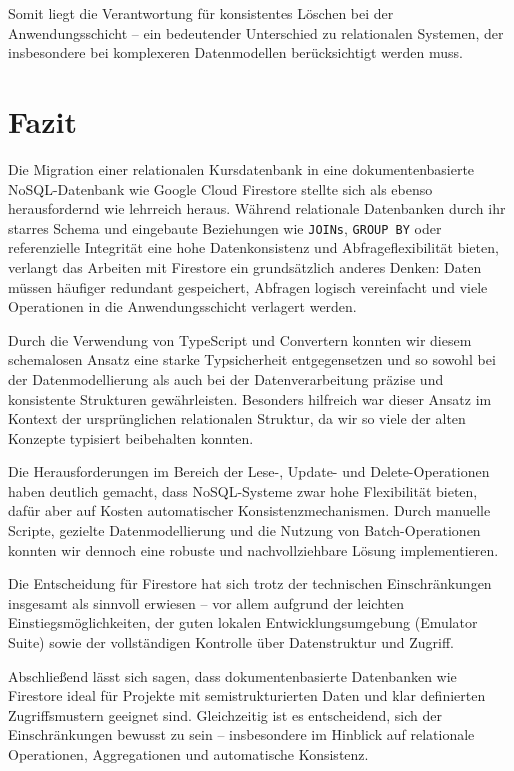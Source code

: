 \documentclass[12pt,a4paper%
              ,oneside     %
              ,titlepage
              ,DIV=13
              ,headinclude
              ,footinclude=false%
              ,cleardoublepage=empty%
              ,parskip=half,
              BCOR=0mm,
              ]{scrreprt}
\begin{document}
Somit liegt die Verantwortung für konsistentes Löschen bei der Anwendungsschicht – ein bedeutender Unterschied zu relationalen Systemen, der insbesondere bei komplexeren Datenmodellen berücksichtigt werden muss.

\chapter{Fazit}

Die Migration einer relationalen Kursdatenbank in eine dokumentenbasierte NoSQL-Datenbank wie Google Cloud Firestore stellte sich als ebenso herausfordernd wie lehrreich heraus. Während relationale Datenbanken durch ihr starres Schema und eingebaute Beziehungen wie \texttt{JOINs}, \texttt{GROUP BY} oder referenzielle Integrität eine hohe Datenkonsistenz und Abfrageflexibilität bieten, verlangt das Arbeiten mit Firestore ein grundsätzlich anderes Denken: Daten müssen häufiger redundant gespeichert, Abfragen logisch vereinfacht und viele Operationen in die Anwendungsschicht verlagert werden.

Durch die Verwendung von TypeScript und Convertern konnten wir diesem schemalosen Ansatz eine starke Typsicherheit entgegensetzen und so sowohl bei der Datenmodellierung als auch bei der Datenverarbeitung präzise und konsistente Strukturen gewährleisten. Besonders hilfreich war dieser Ansatz im Kontext der ursprünglichen relationalen Struktur, da wir so viele der alten Konzepte typisiert beibehalten konnten.

Die Herausforderungen im Bereich der Lese-, Update- und Delete-Operationen haben deutlich gemacht, dass NoSQL-Systeme zwar hohe Flexibilität bieten, dafür aber auf Kosten automatischer Konsistenzmechanismen. Durch manuelle Scripte, gezielte Datenmodellierung und die Nutzung von Batch-Operationen konnten wir dennoch eine robuste und nachvollziehbare Lösung implementieren.

Die Entscheidung für Firestore hat sich trotz der technischen Einschränkungen insgesamt als sinnvoll erwiesen – vor allem aufgrund der leichten Einstiegsmöglichkeiten, der guten lokalen Entwicklungsumgebung (Emulator Suite) sowie der vollständigen Kontrolle über Datenstruktur und Zugriff.

Abschließend lässt sich sagen, dass dokumentenbasierte Datenbanken wie Firestore ideal für Projekte mit semistrukturierten Daten und klar definierten Zugriffsmustern geeignet sind. Gleichzeitig ist es entscheidend, sich der Einschränkungen bewusst zu sein – insbesondere im Hinblick auf relationale Operationen, Aggregationen und automatische Konsistenz.
\end{document}
